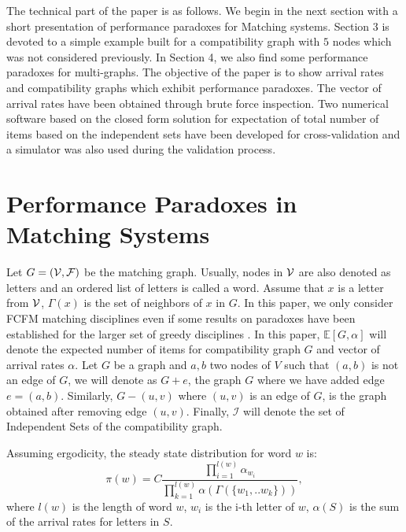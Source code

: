 \documentclass{llncs}
\begin{document}
The technical part of the paper is as follows. We begin in the next section with a short presentation
of performance paradoxes for Matching systems. Section 3 is devoted to a simple example built
for a compatibility graph with $5$ nodes which  was not considered previously. 
In Section 4, we also find some performance paradoxes for multi-graphs.%
The objective of the paper is to  show arrival rates and compatibility graphs which 
exhibit performance paradoxes. The vector of arrival rates have been obtained 
through brute force inspection. Two numerical software 
based on the closed form solution for expectation of total number of items 
based on the independent sets 
have been developed for cross-validation and a simulator was also used during the validation process. 

\section{Performance Paradoxes in Matching Systems} 

Let $G=(\cal{V},\cal{F)} $ be the matching graph. Usually, nodes in $\cal{V}$ are also denoted as letters and  an 
ordered list of letters is  called a word. 
Assume that  $x$ is a letter from $\cal{V}$, $\Gamma(x) $ is the set of neighbors of $x$ in $G$. In this paper, 
we only consider FCFM matching disciplines even if some results on paradoxes have been established for 
the larger set of greedy disciplines \cite{BCDF24}.  In this paper, $\mathbb{E} [G, \alpha] $ will denote the 
expected number of items for compatibility graph $G$ and vector of arrival rates $\alpha$. 
Let $G$ be a graph and $a,b$ two nodes of $V$ such that $(a,b)$ is not an edge of $G$, 
we will denote as $G+e$, the graph $G$ where we have added edge $e=(a,b)$. 
Similarly,  $G-(u,v)$ where $(u,v)$ is an edge of $G$, is the graph obtained after removing edge $(u,v)$.
Finally, $\mathcal{I}$ will denote the set of Independent Sets of the compatibility graph.
  
\begin{theorem} \label{th:simple} \cite{MBMa21}
Assuming ergodicity, the steady state distribution for word $w$ is:
\[
\pi (w) = C \frac{\prod_{i=1}^{l(w)} \alpha_{w_i} }{\prod_{k=1}^{l(w)} \alpha(\Gamma(\{w_1,..w_k\}))},  
\]
where $l(w)$ is the length of word $w$, $w_i$ is the i-th letter of $w$, $\alpha (S)$ is 
the sum of the arrival rates for letters in $S$.
\end{theorem}
\end{document}
